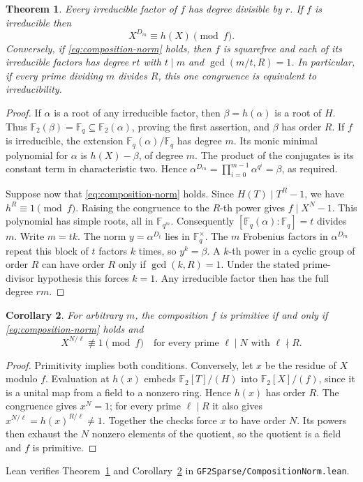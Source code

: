\documentclass[11pt]{article}
\newtheorem{theorem}{Theorem}
\newtheorem{corollary}[theorem]{Corollary}
\newcommand{\F}{\mathbb F_2}
\begin{document}
\begin{theorem}\label{thm:composition-norm}
Every irreducible factor of \(f\) has degree divisible by \(r\).
If \(f\) is irreducible then
\begin{equation}\label{eq:composition-norm}
                         X^{D_m}\equiv h(X)\pmod f .
\end{equation}
Conversely, if \eqref{eq:composition-norm} holds, then \(f\) is
squarefree and each of its irreducible factors has degree \(rt\) with
\(t\mid m\) and \(\gcd(m/t,R)=1\). In particular, if every prime
dividing \(m\) divides \(R\), this one congruence is equivalent to
irreducibility.
\end{theorem}
\begin{proof}
If \(\alpha\) is a root of any irreducible factor, then
\(\beta=h(\alpha)\) is a root of \(H\). Thus
\(\F(\beta)=\mathbb F_q\subseteq\F(\alpha)\), proving the first
assertion, and \(\beta\) has order \(R\).
If \(f\) is irreducible, the extension
\(\mathbb F_q(\alpha)/\mathbb F_q\) has degree \(m\).
Its monic minimal polynomial for \(\alpha\) is \(h(X)-\beta\), of
degree \(m\). The product of the conjugates is its constant term in
characteristic two. Hence
\(\alpha^{D_m}=\prod_{i=0}^{m-1}\alpha^{q^i}=\beta\), as required.

Suppose now that \eqref{eq:composition-norm} holds.
Since \(H(T)\mid T^R-1\), we have \(h^R\equiv1\pmod f\).
Raising the congruence to the \(R\)-th power gives \(f\mid X^N-1\).
This polynomial has simple roots, all in \(\mathbb F_{q^m}\).
Consequently \([\mathbb F_q(\alpha):\mathbb F_q]=t\) divides \(m\).
Write \(m=tk\). The norm \(y=\alpha^{D_t}\) lies in
\(\mathbb F_q^\times\). The \(m\) Frobenius factors in
\(\alpha^{D_m}\) repeat this block of \(t\) factors \(k\) times,
so \(y^k=\beta\). A \(k\)-th power in a cyclic group of order \(R\)
can have order \(R\) only if \(\gcd(k,R)=1\).
Under the stated prime-divisor hypothesis this forces \(k=1\).
Any irreducible factor then has the full degree \(rm\).
\end{proof}

\begin{corollary}\label{cor:composition-order}
For arbitrary \(m\), the composition \(f\) is primitive if and only if
\eqref{eq:composition-norm} holds and
\[
 X^{N/\ell}\not\equiv1\pmod f
 \quad\text{for every prime }\ell\mid N\text{ with }\ell\nmid R .
\]
\end{corollary}
\begin{proof}
Primitivity implies both conditions. Conversely, let \(x\) be the
residue of \(X\) modulo \(f\). Evaluation at \(h(x)\) embeds
\(\F[T]/(H)\) into \(\F[X]/(f)\), since it is a unital map from
a field to a nonzero ring. Hence \(h(x)\) has order \(R\).
The congruence gives \(x^N=1\); for every prime \(\ell\mid R\)
it also gives \(x^{N/\ell}=h(x)^{R/\ell}\ne1\).
Together the checks force \(x\) to have order \(N\).
Its powers then exhaust the \(N\) nonzero elements of the quotient,
so the quotient is a field and \(f\) is primitive.
\end{proof}
Lean verifies Theorem~\ref{thm:composition-norm} and
Corollary~\ref{cor:composition-order} in
\texttt{GF2Sparse/CompositionNorm.lean}.
\end{document}
